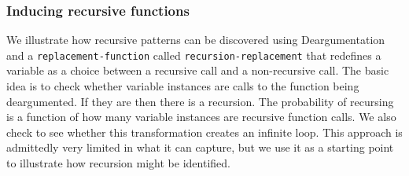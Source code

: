 \documentclass[a4paper,10pt]{article}
\begin{document}
\subsubsection{Inducing recursive functions}
We illustrate how recursive patterns can be discovered using Deargumentation and a \texttt{replacement-function} called \texttt{recursion-replacement} that redefines a variable as a choice between a recursive call and a non-recursive call.  The basic idea is to check whether variable instances are calls to the function being deargumented.  If they are then there is a recursion.  The probability of recursing is a function of how many variable instances are recursive function calls.  We also check to see whether this transformation creates an infinite loop.  This approach is admittedly very limited in what it can capture, but we use it as a starting point to illustrate how recursion might be identified.
\end{document}
